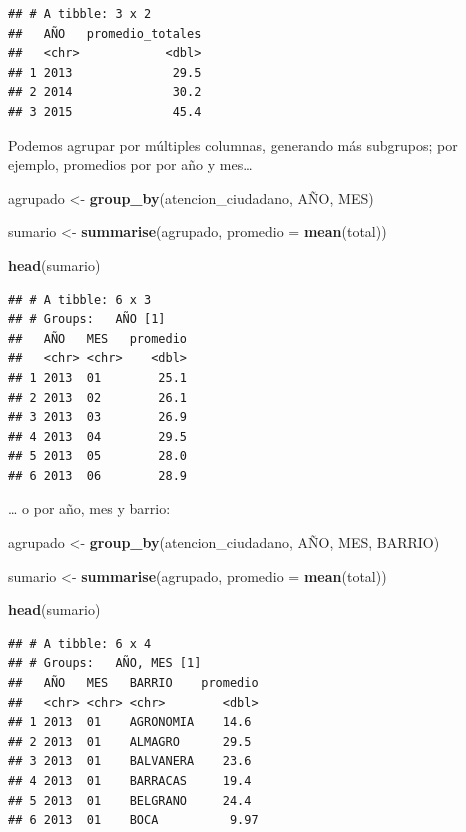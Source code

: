 \documentclass[spanish,]{book}
\newenvironment{Shaded}{\begin{snugshade}}{\end{snugshade}}
\newcommand{\DataTypeTok}[1]{\textcolor[rgb]{0.13,0.29,0.53}{#1}}
\newcommand{\KeywordTok}[1]{\textcolor[rgb]{0.13,0.29,0.53}{\textbf{#1}}}
\newcommand{\NormalTok}[1]{#1}
\newcommand{\StringTok}[1]{\textcolor[rgb]{0.31,0.60,0.02}{#1}}
\begin{document}
\begin{verbatim}
## # A tibble: 3 x 2
##   AÑO   promedio_totales
##   <chr>            <dbl>
## 1 2013              29.5
## 2 2014              30.2
## 3 2015              45.4
\end{verbatim}

Podemos agrupar por múltiples columnas, generando más subgrupos; por ejemplo, promedios por por año y mes\ldots{}

\begin{Shaded}
\begin{Highlighting}[]
\NormalTok{agrupado <-}\StringTok{ }\KeywordTok{group_by}\NormalTok{(atencion_ciudadano, AÑO, MES)}

\NormalTok{sumario <-}\StringTok{ }\KeywordTok{summarise}\NormalTok{(agrupado, }\DataTypeTok{promedio =} \KeywordTok{mean}\NormalTok{(total))}

\KeywordTok{head}\NormalTok{(sumario)}
\end{Highlighting}
\end{Shaded}

\begin{verbatim}
## # A tibble: 6 x 3
## # Groups:   AÑO [1]
##   AÑO   MES   promedio
##   <chr> <chr>    <dbl>
## 1 2013  01        25.1
## 2 2013  02        26.1
## 3 2013  03        26.9
## 4 2013  04        29.5
## 5 2013  05        28.0
## 6 2013  06        28.9
\end{verbatim}

\ldots{} o por año, mes y barrio:

\begin{Shaded}
\begin{Highlighting}[]
\NormalTok{agrupado <-}\StringTok{ }\KeywordTok{group_by}\NormalTok{(atencion_ciudadano, AÑO, MES, BARRIO)}

\NormalTok{sumario <-}\StringTok{ }\KeywordTok{summarise}\NormalTok{(agrupado, }\DataTypeTok{promedio =} \KeywordTok{mean}\NormalTok{(total))}

\KeywordTok{head}\NormalTok{(sumario)}
\end{Highlighting}
\end{Shaded}

\begin{verbatim}
## # A tibble: 6 x 4
## # Groups:   AÑO, MES [1]
##   AÑO   MES   BARRIO    promedio
##   <chr> <chr> <chr>        <dbl>
## 1 2013  01    AGRONOMIA    14.6 
## 2 2013  01    ALMAGRO      29.5 
## 3 2013  01    BALVANERA    23.6 
## 4 2013  01    BARRACAS     19.4 
## 5 2013  01    BELGRANO     24.4 
## 6 2013  01    BOCA          9.97
\end{verbatim}
\end{document}
